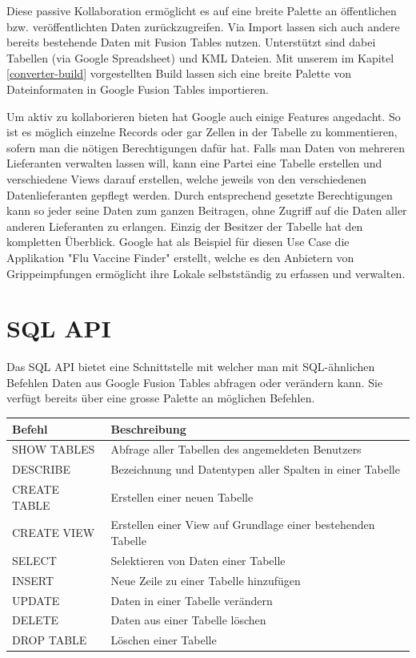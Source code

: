 Diese passive Kollaboration ermöglicht es auf eine breite Palette an öffentlichen bzw. veröffentlichten Daten zurückzugreifen. Via Import lassen sich auch andere bereits bestehende Daten mit Fusion Tables nutzen. Unterstützt sind dabei Tabellen (via Google Spreadsheet) und KML Dateien. Mit unserem im Kapitel \ref{converter-build} vorgestellten Build lassen sich eine breite Palette von Dateinformaten in Google Fusion Tables importieren.

Um aktiv zu kollaborieren bieten hat Google auch einige Features angedacht. So ist es möglich einzelne Records oder gar Zellen in der Tabelle zu kommentieren, sofern man die nötigen Berechtigungen dafür hat. Falls man Daten von mehreren Lieferanten verwalten lassen will, kann eine Partei eine Tabelle erstellen und verschiedene Views darauf erstellen, welche jeweils von den verschiedenen Datenlieferanten gepflegt werden. Durch entsprechend gesetzte Berechtigungen kann so jeder seine Daten zum ganzen Beitragen, ohne Zugriff auf die Daten aller anderen Lieferanten zu erlangen. Einzig der Besitzer der Tabelle hat den kompletten Überblick. Google hat als Beispiel für diesen Use Case die Applikation "Flu Vaccine Finder" erstellt, welche es den Anbietern von Grippeimpfungen ermöglicht ihre Lokale selbstständig zu erfassen und verwalten.\cite{data-gathering}


\section{SQL API}
\label{sql-api}
Das SQL API bietet eine Schnittstelle mit welcher man mit SQL-ähnlichen Befehlen Daten aus Google Fusion Tables abfragen oder verändern kann. Sie verfügt bereits über eine grosse Palette an möglichen Befehlen.

\begin{longtable}{|l|p{11cm}|}
\hline 
\textbf{Befehl} & \textbf{Beschreibung} \\ 
\hline 
SHOW TABLES & Abfrage aller Tabellen des angemeldeten Benutzers \\ 
\hline 
DESCRIBE & Bezeichnung und Datentypen aller Spalten in einer Tabelle \\ 
\hline 
CREATE TABLE & Erstellen einer neuen Tabelle \\ 
\hline 
CREATE VIEW & Erstellen einer View auf Grundlage einer bestehenden Tabelle \\ 
\hline 
SELECT & Selektieren von Daten einer Tabelle \\ 
\hline 
INSERT & Neue Zeile zu einer Tabelle hinzufügen \\ 
\hline 
UPDATE & Daten in einer Tabelle verändern \\ 
\hline 
DELETE & Daten aus einer Tabelle löschen \\ 
\hline 
DROP TABLE & Löschen einer Tabelle \\ 
\hline 
\end{longtable}

